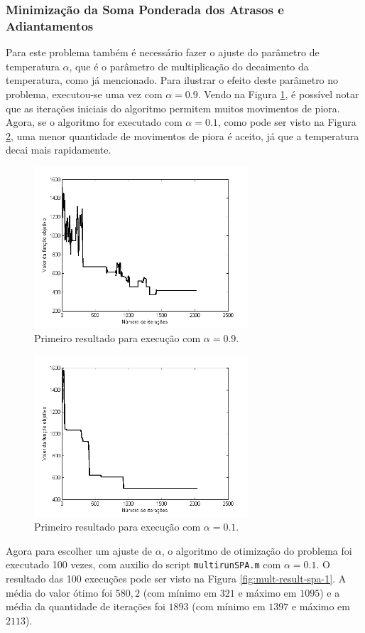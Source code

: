 \documentclass[conference]{IEEEtran}
\begin{document}
\subsubsection{Minimização da Soma Ponderada dos Atrasos e Adiantamentos}
Para este problema também é necessário fazer o ajuste do parâmetro de temperatura $\alpha$, que é o parâmetro de multiplicação do decaimento da temperatura, como já mencionado. Para ilustrar o efeito deste parâmetro no problema, executou-se uma vez com $\alpha = 0.9$. Vendo na Figura \ref{fig:result-spa-1}, é possível notar que as iterações iniciais do algoritmo permitem muitos movimentos de piora. Agora, se o algoritmo for executado com $\alpha = 0.1$, como pode ser visto na Figura \ref{fig:result-spa-2}, uma menor quantidade de movimentos de piora é aceito, já que a temperatura decai mais rapidamente.

	\begin{figure}[h]
		\centering
		\includegraphics[width=8cm]{img/result-spa-1.png}
		\caption{Primeiro resultado para execução com $\alpha = 0.9$.}
		\label{fig:result-spa-1}
	\end{figure}
	
	\begin{figure}[h]
		\centering
		\includegraphics[width=8cm]{img/result-spa-2.png}
		\caption{Primeiro resultado para execução com $\alpha = 0.1$.}
		\label{fig:result-spa-2}
	\end{figure}
	\newpage
Agora para escolher um ajuste de $\alpha$, o algoritmo de otimização do problema foi executado 100 vezes, com auxilio do script \texttt{multirunSPA.m} com $\alpha = 0.1$. O resultado das 100 execuções pode ser visto na Figura \ref{fig:mult-result-spa-1}. A média do valor ótimo foi $580,2$ (com mínimo em $321$ e máximo em $1095$) e a média da quantidade de iterações foi $1893$ (com mínimo em $1397$ e máximo em $2113$).
\end{document}
